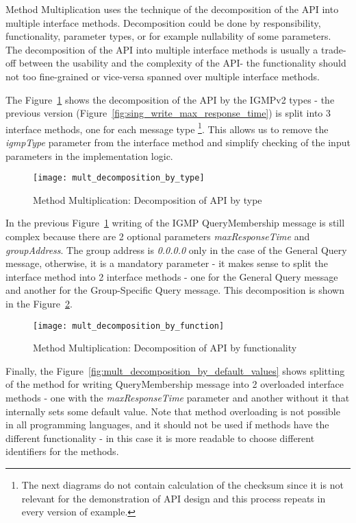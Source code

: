 Method Multiplication uses the technique of the decomposition of the API into multiple interface methods.
Decomposition could be done by responsibility, functionality, parameter types, or for example
nullability of some parameters.
The decomposition of the API into multiple interface methods is usually a trade-off between the usability and
the complexity of the API\@ - the functionality should not too fine-grained or vice-versa spanned over
multiple interface methods.

The Figure~\ref{fig:mult_decomposition_by_type} shows the decomposition of the API by the IGMPv2 types - the previous
version (Figure~\ref{fig:sing_write_max_response_time}) is split into 3 interface methods, one for each message type
\footnote{The next diagrams do not contain calculation of the checksum since it is not relevant for the demonstration
of API design and this process repeats in every version of example.}.
This allows us to remove the \textit{igmpType} parameter from the interface method and simplify checking of the input
parameters in the implementation logic.

\begin{figure}[!htb]
    \centering
    \texttt{[image: mult\_decomposition\_by\_type]}
    \caption{Method Multiplication: Decomposition of API by type}
    \label{fig:mult_decomposition_by_type}
\end{figure}

In the previous Figure~\ref{fig:mult_decomposition_by_type} writing of the IGMP QueryMembership message is still
complex because there are 2 optional parameters \textit{maxResponseTime} and \textit{groupAddress}.
The group address is \textit{0.0.0.0} only in the case of the General Query message, otherwise, it is a mandatory
parameter - it makes sense to split the interface method into 2 interface methods - one for the General Query
message and another for the Group-Specific Query message.
This decomposition is shown in the Figure~\ref{fig:mult_decomposition_by_function}.

\begin{figure}[!htb]
    \centering
    \texttt{[image: mult\_decomposition\_by\_function]}
    \caption{Method Multiplication: Decomposition of API by functionality}
    \label{fig:mult_decomposition_by_function}
\end{figure}

Finally, the Figure~\ref{fig:mult_decomposition_by_default_values} shows splitting of the method for writing
QueryMembership message into 2 overloaded interface methods - one with the \textit{maxResponseTime} parameter and
another without it that internally sets some default value.
Note that method overloading is not possible in all programming languages, and it should not be used if methods
have the different functionality - in this case it is more readable to choose different identifiers for the methods.

